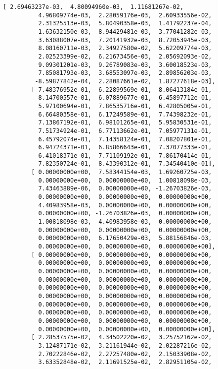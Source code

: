 \documentclass[11pt]{article}
\begin{document}
\begin{tcolorbox}[breakable, size=fbox, boxrule=.5pt, pad at break*=1mm, opacityfill=0]
\begin{Verbatim}[commandchars=\\\{\}]
        [ 2.69463237e-03,  4.80094960e-03,  1.11681267e-02,
          4.96809774e-03,  2.28059176e-03,  2.60933556e-02,
          2.31325513e-03,  5.80490358e-03,  1.41792237e-04,
          1.63632150e-03,  8.94429481e-03,  3.77041282e-03,
          3.63088007e-03,  7.20141932e-03,  8.72053945e-03,
          8.08160711e-03,  2.34927580e-02,  5.62209774e-03,
          2.02523399e-02,  6.21673456e-03,  2.05692093e-02,
          9.09301201e-03,  9.26789083e-03,  3.60018523e-03,
          7.85081793e-03,  3.68553097e-03,  2.89856203e-03,
         -8.59877842e-04,  2.28087661e-02,  1.87277618e-03],
        [ 7.48376952e-01,  6.22899569e-01,  8.06413184e-01,
          8.14700557e-01,  6.07889677e-01,  6.45897712e-01,
          5.97100694e-01,  7.86535716e-01,  6.42805005e-01,
          6.66480358e-01,  6.17249589e-01,  7.74398232e-01,
          7.13867192e-01,  6.98101265e-01,  5.95830531e-01,
          7.51734924e-01,  6.77113662e-01,  7.05977131e-01,
          6.45792074e-01,  7.14358124e-01,  7.08207801e-01,
          6.94724371e-01,  6.85866643e-01,  7.37077333e-01,
          6.41018371e-01,  7.71109192e-01,  7.86170414e-01,
          7.82350724e-01,  8.43390312e-01,  7.34540410e-01],
        [ 0.00000000e+00,  7.58344154e-03,  1.69260725e-03,
          0.00000000e+00,  0.00000000e+00,  1.00818098e-03,
          7.43463889e-06,  0.00000000e+00, -1.26703826e-03,
          0.00000000e+00,  0.00000000e+00,  0.00000000e+00,
          4.40983958e-03,  0.00000000e+00,  0.00000000e+00,
          0.00000000e+00, -1.26703826e-03,  0.00000000e+00,
          1.00818098e-03,  4.40983958e-03,  0.00000000e+00,
          0.00000000e+00,  0.00000000e+00,  0.00000000e+00,
          0.00000000e+00,  6.17650429e-03,  5.88156846e-03,
          0.00000000e+00,  0.00000000e+00,  0.00000000e+00],
        [ 0.00000000e+00,  0.00000000e+00,  0.00000000e+00,
          0.00000000e+00,  0.00000000e+00,  0.00000000e+00,
          0.00000000e+00,  0.00000000e+00,  0.00000000e+00,
          0.00000000e+00,  0.00000000e+00,  0.00000000e+00,
          0.00000000e+00,  0.00000000e+00,  0.00000000e+00,
          0.00000000e+00,  0.00000000e+00,  0.00000000e+00,
          0.00000000e+00,  0.00000000e+00,  0.00000000e+00,
          0.00000000e+00,  0.00000000e+00,  0.00000000e+00,
          0.00000000e+00,  0.00000000e+00,  0.00000000e+00,
          0.00000000e+00,  0.00000000e+00,  0.00000000e+00],
        [ 2.28537575e-02,  4.34502220e-02,  3.25752162e-02,
          3.12487171e-02,  3.21161944e-02,  2.02287216e-02,
          2.70222846e-02,  2.27257480e-02,  2.15033908e-02,
          3.63352848e-02,  2.11691525e-02,  2.82951105e-02,

\end{Verbatim}
\end{tcolorbox}
\end{document}
